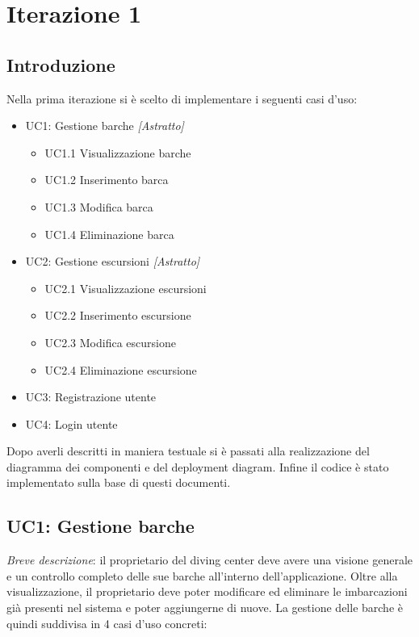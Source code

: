 \chapter{Iterazione 1}

\section{Introduzione}
Nella prima iterazione si è scelto di implementare i seguenti casi d'uso:

\begin{itemize}
    \item UC1: Gestione barche \textit{[Astratto]}
          \begin{itemize}
              \item UC1.1 Visualizzazione barche
              \item UC1.2 Inserimento barca
              \item UC1.3 Modifica barca
              \item UC1.4 Eliminazione barca
          \end{itemize}
    \item UC2: Gestione escursioni \textit{[Astratto]}
          \begin{itemize}
              \item UC2.1 Visualizzazione escursioni
              \item UC2.2 Inserimento escursione
              \item UC2.3 Modifica escursione
              \item UC2.4 Eliminazione escursione
          \end{itemize}
    \item UC3: Registrazione utente
    \item UC4: Login utente
\end{itemize}
Dopo averli descritti in maniera testuale si è passati alla realizzazione del diagramma dei componenti e del deployment diagram.
Infine il codice è stato implementato sulla base di questi documenti.

\section{UC1: Gestione barche}

\emph{Breve descrizione}: il proprietario del diving center deve avere una visione generale e un controllo completo delle sue barche all'interno dell'applicazione.
Oltre alla visualizzazione, il proprietario deve poter modificare ed eliminare le imbarcazioni già presenti nel sistema e poter aggiungerne di nuove.
La gestione delle barche è quindi suddivisa in 4 casi d'uso concreti:

